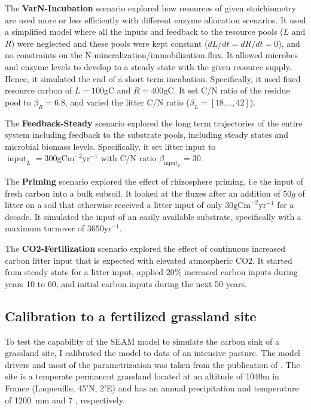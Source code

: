 The \textbf{VarN-Incubation} scenario explored how resources of given
stoichiometry are used more or less efficiently with different enzyme allocation
scenarios. It used a simplified model where all the inputs and feedback to the
resource pools ($L$ and $R$) were neglected and these pools were kept constant
($dL/dt = dR/dt = 0$), and no constraints on the N-mineralization/immobilization
flux. It allowed microbes and enzyme levels to develop to a steady
state with the given resource supply. Hence, it simulated the end of a short term
incubation. Specifically, it used fixed resource carbon of $L=100\mathrm{gC}$
and $R=400\mathrm{gC}$. It set C/N ratio of the residue pool to $\beta_R=6.8$,
and varied the litter C/N ratio ($\beta_L = [18,..,42]$).

The \textbf{Feedback-Steady} scenario explored the long term trajectories of the
entire system including feedback to the substrate pools, including steady states
and microbial biomass levels. Specifically, it set litter input to
$\operatorname{input}_L = 300\mathrm{gCm}^{-2}\mathrm{yr}^{-1}$ with C/N ratio
$\beta_{\operatorname{input}_L} = 30$.

The \textbf{Priming} scenario explored the effect of rhizosphere priming, i.e
the input of fresh carbon into a bulk subsoil. It looked at the fluxes after
an addition of $50g$ of litter on a soil that otherwise
received a litter input of only $30\mathrm{gCm}^{-2}\mathrm{yr}^{-1}$ for a
decade. It simulated the input of an easily available substrate, specifically
with a maximum turnover of $3650\mathrm{yr}^{-1}$.

The \textbf{CO2-Fertilization} scenario explored the effect of continuous 
increased carbon litter input that is expected with elevated atmospheric CO2.
It started from steady state for a litter input, applied 20\% increased
carbon inputs during years 10 to 60, and initial carbon inputs during the
next 50 years. 

\subsection{Calibration to a fertilized grassland site
\label{sec:methodsPasture}} 

To test the capability of the SEAM model to simulate the carbon sink of a
grassland site, I calibrated the model to data of an intensive pasture. The
model drivers and most of the parametrization was taken from the publication of
\citep{Perveen14}. The site is a temperate permanent grassland
located at an altitude of 1040m in France (Laqueuille, 45'N,
2'E) and has an annual precipitation and temperature of
1200~mm and 7 , respectively. 

